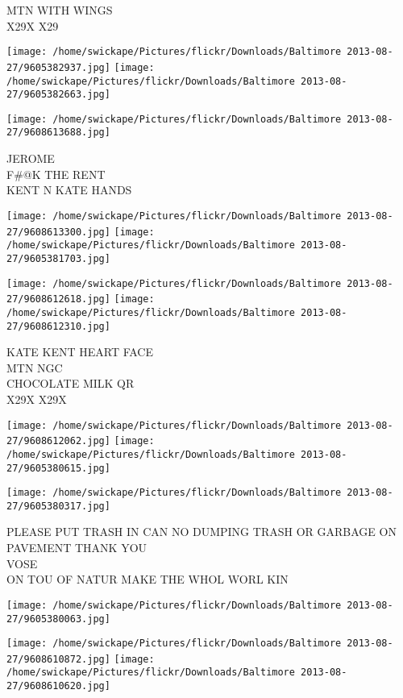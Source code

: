 \documentclass[10pt,letterpaper]{article}
\begin{document}
MTN WITH WINGS\\
X29X X29
\pagebreak

\texttt{[image: /home/swickape/Pictures/flickr/Downloads/Baltimore 2013-08-27/9605382937.jpg]}
\texttt{[image: /home/swickape/Pictures/flickr/Downloads/Baltimore 2013-08-27/9605382663.jpg]}

\vspace{0.25in}
\texttt{[image: /home/swickape/Pictures/flickr/Downloads/Baltimore 2013-08-27/9608613688.jpg]}

JEROME\\
F\#@K THE RENT\\
KENT N KATE HANDS
\pagebreak

\texttt{[image: /home/swickape/Pictures/flickr/Downloads/Baltimore 2013-08-27/9608613300.jpg]}
\texttt{[image: /home/swickape/Pictures/flickr/Downloads/Baltimore 2013-08-27/9605381703.jpg]}

\texttt{[image: /home/swickape/Pictures/flickr/Downloads/Baltimore 2013-08-27/9608612618.jpg]}
\texttt{[image: /home/swickape/Pictures/flickr/Downloads/Baltimore 2013-08-27/9608612310.jpg]}

KATE KENT HEART FACE\\
MTN NGC\\
CHOCOLATE MILK QR\\
X29X X29X
\pagebreak

\texttt{[image: /home/swickape/Pictures/flickr/Downloads/Baltimore 2013-08-27/9608612062.jpg]}
\texttt{[image: /home/swickape/Pictures/flickr/Downloads/Baltimore 2013-08-27/9605380615.jpg]}

\texttt{[image: /home/swickape/Pictures/flickr/Downloads/Baltimore 2013-08-27/9605380317.jpg]}

PLEASE PUT TRASH IN CAN NO DUMPING TRASH OR GARBAGE ON PAVEMENT THANK YOU\\
VOSE\\
ON TOU OF NATUR MAKE THE WHOL WORL KIN
\pagebreak

\texttt{[image: /home/swickape/Pictures/flickr/Downloads/Baltimore 2013-08-27/9605380063.jpg]}

\vspace{0.25in}
\texttt{[image: /home/swickape/Pictures/flickr/Downloads/Baltimore 2013-08-27/9608610872.jpg]}
\texttt{[image: /home/swickape/Pictures/flickr/Downloads/Baltimore 2013-08-27/9608610620.jpg]}
\end{document}
